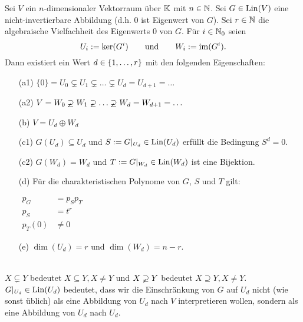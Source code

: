 \begin{lm}
	Sei $ V $ ein $ n $-dimensionaler Vektorraum über $ \mathbb K $ mit $ n \in \mathbb N $. Sei $ G \in \operatorname{Lin}(V) $ eine nicht-invertierbare Abbildung (d.h. 0 ist Eigenwert von $ G $). Sei $ r \in \mathbb N $ die algebraische Vielfachheit des Eigenwerts 0 von $ G $. Für $ i \in \mathbb N_0 $ seien
	\begin{equation*}
		U_i := \ker(G^i) \qquad\text{und}\qquad W_i := \operatorname{im}(G^i).
	\end{equation*}
	Dann existiert ein Wert $ d \in \{ 1,\ldots,r \} $ mit den folgenden Eigenschaften:
	\begin{itemize}[font=\normalfont]
		\item[(a1)]
			$ \{ 0 \} = U_0 \varsubsetneq U_1 \varsubsetneq \ldots \varsubsetneq U_d = U_{d+1} = \ldots $
		\item[(a2)]
			$ V = W_0 \varsupsetneq W_1 \varsupsetneq \ldots \varsupsetneq W_d = W_{d+1} = \ldots $
		\item[(b)]
			$ V = U_d \oplus W_d $
		\item[(c1)]
			$ G(U_d) \subseteq U_d $ und $ S := G|_{U_d} \in \operatorname{Lin}(U_d) $ erfüllt die Bedingung $ S^d = 0 $.
		\item[(c2)]
			$ G(W_d) = W_d $ und $ T := G|_{W_d} \in \operatorname{Lin}(W_d) $ ist eine Bijektion.
		\item[(d)]
			Für die charakteristischen Polynome von $ G $, $ S $ und $ T $ gilt:
			
			$ \begin{aligned}
				p_G &= p_S p_T \\
				p_S &= t^r \\
				p_T(0) &\neq 0
			\end{aligned} $
		\item[(e)]
			$ \dim(U_d) = r $ und $ \dim(W_d) = n-r $.
	\end{itemize}
\end{lm}
\begin{bem}\ \\
	$ X \varsubsetneq Y $ bedeutet $ X \subseteq Y, X \neq Y $ und $ X \varsupsetneq Y $ bedeutet $ X \supseteq Y, X \neq Y $. \\
	$ G|_{U_d} \in \operatorname{Lin}(U_d) $ bedeutet, dass wir die Einschränkung von $ G $ auf $ U_d $ nicht (wie sonst üblich) als eine Abbildung von $ U_d $ nach $ V $ interpretieren wollen, sondern als eine Abbildung von $ U_d $ nach $ U_d $.
\end{bem}
